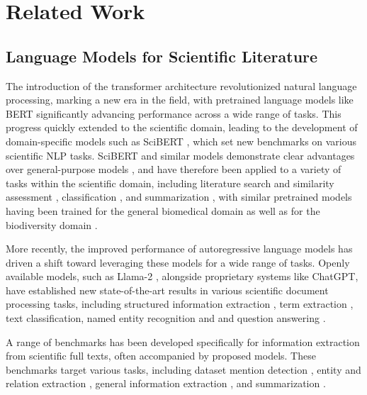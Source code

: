 \section{Related Work}
\label{sec:2}

\subsection{Language Models for Scientific Literature}%

The introduction of the transformer architecture \cite{attentionisallyouneed} revolutionized natural language processing, marking a new era in the field, with pretrained language models like BERT \cite{devlin-etal-2019-bert} significantly advancing performance across a wide range of tasks. This progress quickly extended to the scientific domain, leading to the development of domain-specific models such as SciBERT \cite{beltagy2019scibert}, which set new benchmarks on various scientific NLP tasks. SciBERT and similar models demonstrate clear advantages over general-purpose models \cite{biobert, song-etal-2023-matsci, rostam2024finetuninglargelanguagemodels}, and have therefore been applied to a variety of tasks within the scientific domain, including literature search and similarity assessment \cite{singh-etal-2023-scirepeval}, classification \cite{rostam2024finetuninglargelanguagemodels}, and summarization \cite{summarization}, with similar pretrained models having been trained for the general biomedical domain \cite{biobert, pubmedbert} as well as for the biodiversity domain \cite{abdelmageed2023biodivbert}.

More recently, the improved performance of autoregressive language models \cite{radford2019language} has driven a shift toward leveraging these models for a wide range of tasks. Openly available models, such as Llama-2 \cite{touvron2023llama2openfoundation}, alongside proprietary systems like ChatGPT, have established new state-of-the-art results in various scientific document processing tasks, including structured information extraction \cite{Rettenberger, dagdelen2024structured}, term extraction \cite{huang2024critical}, text classification, named entity recognition and and question answering \cite{choi2024accelerating}.

A range of benchmarks has been developed specifically for information extraction from scientific full texts, often accompanied by proposed models. These benchmarks target various tasks, including dataset mention detection \cite{dataset}, entity and relation extraction \cite{zhang-etal-2024-scier}, general information extraction \cite{jain-etal-2020-scirex}, and summarization \cite{deyoung-etal-2021-ms}.

